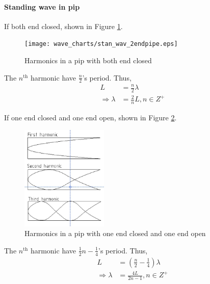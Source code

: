         \paragraph{Standing wave in pip}
            If both end closed, shown in Figure \ref{stan_2endpip}.
            \begin{figure}[H]
                \begin{center}
                    \texttt{[image: wave\_charts/stan\_wav\_2endpipe.eps]}
                \end{center}
                \caption{Harmonics in a pip with both end closed}
                \label{stan_2endpip}
            \end{figure}

            The $n^{\mathrm{th}}$ harmonic have $\frac{n}{2}$'s period. Thus,
            \begin{align}
                L &= \frac{n}{2} \lambda \\
                \Rightarrow \lambda &= \frac{2}{n} L, n \in Z^+
            \end{align}

            If one end closed and one end open, shown in Figure \ref{stan_1endpip}.
            \begin{figure}[H]
                \begin{center}
                    \includegraphics[height=5cm]{wave_charts/stan_wav_1endpipe.eps}
                \end{center}
                \caption{Harmonics in a pip with one end closed and one end open}
                \label{stan_1endpip}
            \end{figure}

            The $n^{\mathrm{th}}$ harmonic have $\frac{1}{2} n - \frac{1}{4}$'s period. Thus,
            \begin{align}
                L &= (\frac{n}{2} - \frac{1}{4}) \lambda \\
                \Rightarrow \lambda &= \frac{4 L}{2 n - 1}, n \in Z^+
            \end{align}

